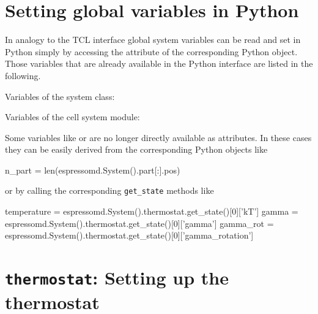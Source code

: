 \section{Setting global variables in Python}
\label{sec:glob-vars-python}
In analogy to the TCL interface global system variables can be read and 
set in Python simply by accessing the attribute of the corresponding \es 
Python object. Those variables that are already available in the Python 
interface are listed in the following.

\vspace{1em}
Variables of the system class:
\begin{pysyntax}
\end{pysyntax}

\vspace{1em}
Variables of the cell system module:
\begin{pysyntax}
\end{pysyntax}

\vspace{1em}
Some variables like  or  are no longer directly 
available as attributes. In these cases they can be easily derived from the 
corresponding Python objects like
\begin{pycode}
  n_part = len(espressomd.System().part[:].pos)
\end{pycode}
or by calling the corresponding \texttt{get\_state} methods like
\begin{pycode}
  temperature = espressomd.System().thermostat.get_state()[0]['kT']
  gamma = espressomd.System().thermostat.get_state()[0]['gamma']
  gamma_rot = espressomd.System().thermostat.get_state()[0]['gamma_rotation']
\end{pycode}


\section{\texttt{thermostat}: Setting up the thermostat}
\label{sec:thermostat}

\begin{pysyntax}
\end{pysyntax}

